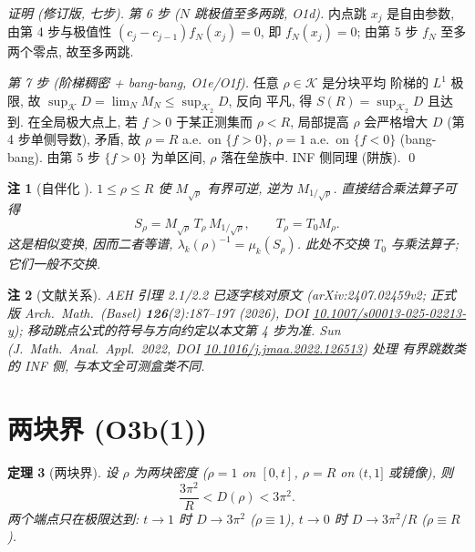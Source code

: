 \documentclass[UTF8]{ctexart}
\newtheorem{theorem}{定理}[section]
\newtheorem{remark}[theorem]{注}
\begin{document}
\begin{proof}[证明 (修订版, 七步)]
\emph{第 6 步 ($N$ 跳极值至多两跳, O1d).} 内点跳 $x_j$ 是自由参数, 由第 4 步与极值性
$(c_j-c_{j-1})f_N(x_j)=0$, 即 $f_N(x_j)=0$; 由第 5 步 $f_N$ 至多两个零点, 故至多两跳.

\emph{第 7 步 (阶梯稠密 + bang-bang, O1e/O1f).} 任意 $\rho\in\mathcal K$ 是分块平均
阶梯的 $L^1$ 极限, 故 $\sup_{\mathcal K}D=\lim_N M_N\le\sup_{\mathcal K_2}D$, 反向
平凡, 得 $S(R)=\sup_{\mathcal K_2}D$ 且达到. 在全局极大点上, 若 $f>0$ 于某正测集而
$\rho<R$, 局部提高 $\rho$ 会严格增大 $D$ (第 4 步单侧导数), 矛盾, 故
$\rho=R$ a.e.\ on $\{f>0\}$, $\rho=1$ a.e.\ on $\{f<0\}$ (bang-bang). 由第 5 步
$\{f>0\}$ 为单区间, $\rho$ 落在垒族中. INF 侧同理 (阱族). \qed
\end{proof}

\begin{remark}[自伴化 \label{rem:srho}]
$1\le\rho\le R$ 使 $M_{\sqrt\rho}$ 有界可逆, 逆为 $M_{1/\sqrt\rho}$.
直接结合乘法算子可得
\[
 S_\rho=M_{\sqrt\rho}\,T_\rho\,M_{1/\sqrt\rho},\qquad
 T_\rho=T_0M_\rho.
\]
这是相似变换, 因而二者等谱, $\lambda_k(\rho)^{-1}=\mu_k(S_\rho)$.
此处不交换 $T_0$ 与乘法算子; 它们一般不交换.
\end{remark}

\begin{remark}[文献关系]
AEH 引理 2.1/2.2 已逐字核对原文 (arXiv:2407.02459v2; 正式版 Arch.\ Math.\ (Basel)
\textbf{126}(2):187--197 (2026), DOI \href{https://doi.org/10.1007/s00013-025-02213-y}{10.1007/s00013-025-02213-y});
移动跳点公式的符号与方向约定以本文第 4 步为准. Sun (J.\ Math.\ Anal.\ Appl.\ 2022,
DOI \href{https://doi.org/10.1016/j.jmaa.2022.126513}{10.1016/j.jmaa.2022.126513}) 处理
有界跳数类的 INF 侧, 与本文全可测盒类不同.
\end{remark}

\section{两块界 (O3b(1))}

\begin{theorem}[两块界]
设 $\rho$ 为两块密度 ($\rho=1$ on $[0,t]$, $\rho=R$ on $(t,1]$ 或镜像), 则
\begin{equation}
	\frac{3\pi^2}{R}<D(\rho)<3\pi^2.
\end{equation}
两个端点只在极限达到: $t\to1$ 时 $D\to3\pi^2$ ($\rho\equiv1$), $t\to0$ 时
$D\to3\pi^2/R$ ($\rho\equiv R$).
\end{theorem}
\end{document}
